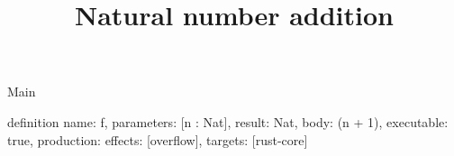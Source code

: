 \begin{lexlean}{Main}
\title{Natural number addition}
\begin{semanticmodule}
definition{
  name: f,
  parameters: [n : Nat],
  result: Nat,
  body: (n + 1),
  executable: true,
  production: {effects: [overflow], targets: [rust-core]}
}
\end{semanticmodule}
\end{lexlean}
